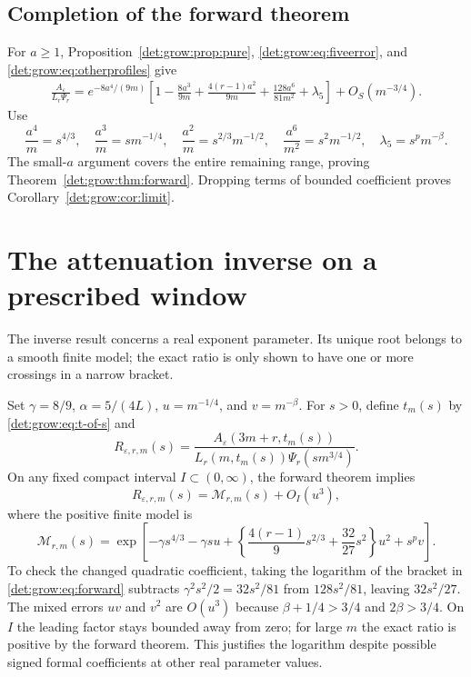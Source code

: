 \documentclass[11pt,letterpaper]{article}
\numberwithin{equation}{section}
\theoremstyle{definition}\newtheorem{definition}[theorem]{Definition}
\theoremstyle{remark}\newtheorem{remark}[theorem]{Remark}
\newcommand{\eps}{\varepsilon}
\newcommand{\M}{\mathcal M}
\begin{document}
\subsection{Completion of the forward theorem}
For $a\ge1$, Proposition~\ref{det:grow:prop:pure}, \eqref{det:grow:eq:fiveerror}, and
\eqref{det:grow:eq:otherprofiles} give
\begin{align*}
 \frac{A_\eps}{L_r\Psi_r}
 =e^{-8a^4/(9m)}\left[1-\frac{8a^3}{9m}
 +\frac{4(r-1)a^2}{9m}+\frac{128a^6}{81m^2}+\lambda_5\right]
 +O_S(m^{-3/4}).
\end{align*}
Use
\[
 \frac{a^4}{m}=s^{4/3},\quad
 \frac{a^3}{m}=s m^{-1/4},\quad
 \frac{a^2}{m}=s^{2/3}m^{-1/2},\quad
 \frac{a^6}{m^2}=s^2m^{-1/2},\quad\lambda_5=s^p m^{-\beta}.
\]
The small-$a$ argument covers the entire remaining range, proving
Theorem~\ref{det:grow:thm:forward}. Dropping terms of bounded coefficient proves
Corollary~\ref{det:grow:cor:limit}.

\section{The attenuation inverse on a prescribed window}\label{det:grow:sec:inverse}
The inverse result concerns a real exponent parameter. Its unique root
belongs to a smooth finite model; the exact ratio is only shown to have
one or more crossings in a narrow bracket.

Set $\gamma=8/9$, $\alpha=5/(4L)$, $u=m^{-1/4}$, and $v=m^{-\beta}$.
For $s>0$, define $t_m(s)$ by \eqref{det:grow:eq:t-of-s} and
\begin{equation}\label{det:grow:eq:exactR}
 R_{\eps,r,m}(s)=
 \frac{A_\eps(3m+r,t_m(s))}
 {L_r(m,t_m(s))\Psi_r(s m^{3/4})}.
\end{equation}
On any fixed compact interval $I\subset(0,\infty)$, the forward theorem
implies
\begin{equation}\label{det:grow:eq:modelerror}
 R_{\eps,r,m}(s)=\M_{r,m}(s)+O_I(u^3),
\end{equation}
where the positive finite model is
\begin{equation}\label{det:grow:eq:model}
 \M_{r,m}(s)=\exp\left[-\gamma s^{4/3}-\gamma s u
 +\left\{\frac{4(r-1)}9s^{2/3}+\frac{32}{27}s^2\right\}u^2+s^p v\right].
\end{equation}
To check the changed quadratic coefficient, taking the logarithm of
the bracket in \eqref{det:grow:eq:forward} subtracts
$\gamma^2s^2/2=32s^2/81$ from $128s^2/81$, leaving $32s^2/27$.
The mixed errors $uv$ and $v^2$ are $O(u^3)$ because
$\beta+1/4>3/4$ and $2\beta>3/4$. On $I$ the leading factor stays
bounded away from zero; for large $m$ the exact ratio is positive by
the forward theorem. This justifies the logarithm despite possible
signed formal coefficients at other real parameter values.
\end{document}
